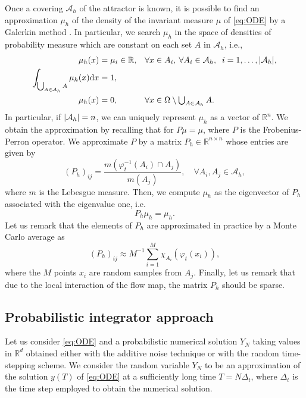 \documentclass{siamart1116}
\numberwithin{theorem}{section}
\DeclarePairedDelimiter{\abs}{\lvert}{\rvert}
\renewcommand{\phi}{\varphi}
\newcommand{\R}{\mathbb{R}}
\newcommand{\sksum}{\textstyle\sum}
\newcommand{\dd}{\mathrm{d}}
\begin{document}
Once a covering $\mathcal{A}_h$ of the attractor is known, it is possible to find an approximation $\mu_h$ of the density of the invariant measure $\mu$ of \eqref{eq:ODE} by a Galerkin method \cite{DHJ97}. In particular, we search $\mu_h$ in the space of densities of probability measure which are constant on each set $A$ in $\mathcal{A}_h$, i.e.,
\begin{equation}
\begin{aligned}
	\mu_h(x) &= \mu_i \in \R, && \forall x \in A_i, \: \forall A_i \in \mathcal{A}_h,\ \: i = 1, \ldots, \abs{\mathcal{A}_h},\\
	\int_{\bigcup_{A\in\mathcal{A}_h} A} \mu_h(x) \dd x &= 1, \\
	\mu_h(x) &= 0, && \forall x \in \Omega \setminus \textstyle \bigcup_{A\in\mathcal{A}_h} A.
\end{aligned}
\end{equation} 
In particular, if $\abs{\mathcal{A}_h} = n$, we can uniquely represent $\mu_h$ as a vector of $\R^n$. We obtain the approximation by recalling that for $P\mu = \mu$, where $P$ is the Frobenius-Perron operator. We approximate $P$ by a matrix $P_h \in \R^{n\times n}$ whose entries are given by
\begin{equation}
	(P_h)_{ij} = \frac{m(\phi_t^{-1}(A_i) \cap A_j)}{m(A_j)}, \quad \forall A_i, A_j \in \mathcal{A}_h,
\end{equation}
where $m$ is the Lebesgue measure. Then, we compute $\mu_h$ as the eigenvector of $P_h$ associated with the eigenvalue one, i.e.
\begin{equation}\label{eq:GalerkinFP}
	P_h \mu_h = \mu_h.
\end{equation}
Let us remark that the elements of $P_h$ are approximated in practice by a Monte Carlo average as
\begin{equation}
	(P_h)_{ij} \approx M^{-1} \sksum_{i = 1}^M \chi_{A_i}(\phi_t(x_i)),
\end{equation}
where the $M$ points $x_i$ are random samples from $A_j$. Finally, let us remark that due to the local interaction of the flow map, the matrix $P_h$ should be sparse.

\subsection{Probabilistic integrator approach} Let us consider \eqref{eq:ODE} and a probabilistic numerical solution $Y_N$ taking values in $\R^d$ obtained either with the additive noise technique \cite{CGS16} or with the random time-stepping scheme. We consider the random variable $Y_N$ to be an approximation of the solution $y(T)$ of \eqref{eq:ODE} at a sufficiently long time $T = N\Delta_t$, where $\Delta_t$ is the time step employed to obtain the numerical solution.
\end{document}

